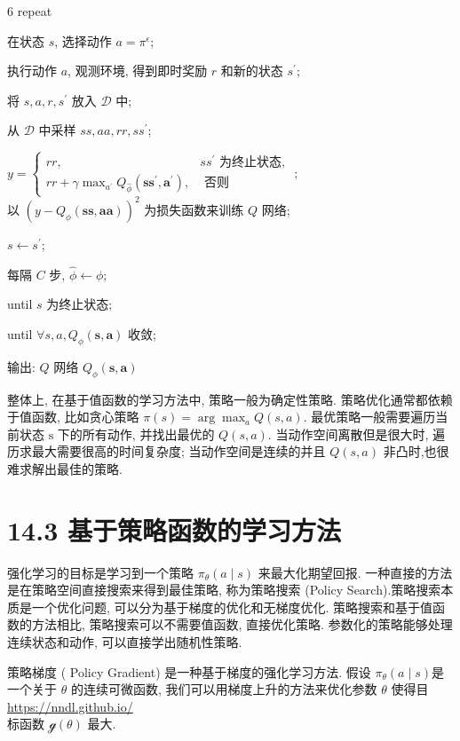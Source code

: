 \documentclass[10pt]{article}
\begin{document}
6 repeat

在状态 $s$, 选择动作 $a=\pi^{\epsilon}$;

执行动作 $a$, 观测环境, 得到即时奖励 $r$ 和新的状态 $s^{\prime}$;

将 $s, a, r, s^{\prime}$ 放入 $\mathcal{D}$ 中;

从 $\mathcal{D}$ 中采样 $s s, a a, r r, s s^{\prime}$;

$y=\left\{\begin{array}{cc}r r, & s s^{\prime} \text { 为终止状态, } \\ r r+\gamma \max _{a^{\prime}} Q_{\hat{\phi}}\left(\mathbf{s s}^{\prime}, \boldsymbol{a}^{\prime}\right), & \text { 否则 }\end{array} ;\right.$\\
以 $\left(y-Q_{\phi}(\boldsymbol{s} \boldsymbol{s}, \boldsymbol{a} \boldsymbol{a})\right)^{2}$ 为损失函数来训练 $Q$ 网络;

$s \leftarrow s^{\prime}$;

每隔 $C$ 步, $\hat{\phi} \leftarrow \phi ;$

until $s$ 为终止状态;

until $\forall s, a, Q_{\phi}(\boldsymbol{s}, \boldsymbol{a})$ 收敛;

输出: $Q$ 网络 $Q_{\phi}(\boldsymbol{s}, \boldsymbol{a})$

整体上, 在基于值函数的学习方法中, 策略一般为确定性策略. 策略优化通常都依赖于值函数, 比如贪心策略 $\pi(s)=\arg \max _{a} Q(s, a)$. 最优策略一般需要遍历当前状态 $\mathrm{s}$ 下的所有动作, 并找出最优的 $Q(s, a)$. 当动作空间离散但是很大时, 遍历求最大需要很高的时间复杂度; 当动作空间是连续的并且 $Q(s, a)$ 非凸时,也很难求解出最佳的策略.

\section*{14.3 基于策略函数的学习方法}
强化学习的目标是学习到一个策略 $\pi_{\theta}(a \mid s)$ 来最大化期望回报. 一种直接的方法是在策略空间直接搜索来得到最佳策略, 称为策略搜索 (Policy Search).策略搜索本质是一个优化问题, 可以分为基于梯度的优化和无梯度优化. 策略搜索和基于值函数的方法相比, 策略搜索可以不需要值函数, 直接优化策略. 参数化的策略能够处理连续状态和动作, 可以直接学出随机性策略.

策略梯度 ( Policy Gradient) 是一种基于梯度的强化学习方法. 假设 $\pi_{\theta}(a \mid s)$是一个关于 $\theta$ 的连续可微函数, 我们可以用梯度上升的方法来优化参数 $\theta$ 使得目 \href{https://nndl.github.io/}{https://nndl.github.io/}\\
标函数 $\mathcal{g}(\theta)$ 最大.
\end{document}
